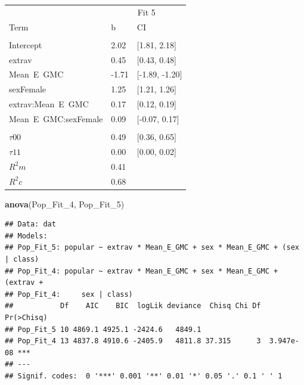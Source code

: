 \documentclass[]{article}
\newenvironment{Shaded}{\begin{snugshade}}{\end{snugshade}}
\newcommand{\KeywordTok}[1]{\textcolor[rgb]{0.13,0.29,0.53}{\textbf{#1}}}
\newcommand{\DecValTok}[1]{\textcolor[rgb]{0.00,0.00,0.81}{#1}}
\newcommand{\NormalTok}[1]{#1}
\begin{document}
\begin{tabular}{lll}
\toprule
\multicolumn{1}{c}{ } & \multicolumn{2}{c}{Fit 5} \\
\cmidrule(l{2pt}r{2pt}){2-3}
Term & b & CI\\
\midrule
\addlinespace[0.3em]
\multicolumn{3}{l}{\textbf{Fixed}}\\
\hspace{1em}Intercept & 2.02 & [1.81, 2.18]\\
\hspace{1em}extrav & 0.45 & [0.43, 0.48]\\
\hspace{1em}Mean\ E\ GMC & -1.71 & [-1.89, -1.20]\\
\hspace{1em}sexFemale & 1.25 & [1.21, 1.26]\\
\hspace{1em}extrav:Mean\ E\ GMC & 0.17 & [0.12, 0.19]\\
\hspace{1em}Mean\ E\ GMC:sexFemale & 0.09 & [-0.07, 0.17]\\
\addlinespace[0.3em]
\multicolumn{3}{l}{\textbf{Random}}\\
\hspace{1em}$\tau {00}$ & 0.49 & [0.36, 0.65]\\
\hspace{1em}$\tau {11}$ & 0.00 & [0.00, 0.02]\\
$R^2 m$ & 0.41 & \\
$R^2 c$ & 0.68 & \\
\bottomrule
\end{tabular}

\begin{Shaded}
\begin{Highlighting}[]
\KeywordTok{anova}\NormalTok{(Pop_Fit_}\DecValTok{4}\NormalTok{, Pop_Fit_}\DecValTok{5}\NormalTok{)}
\end{Highlighting}
\end{Shaded}

\begin{verbatim}
## Data: dat
## Models:
## Pop_Fit_5: popular ~ extrav * Mean_E_GMC + sex * Mean_E_GMC + (sex | class)
## Pop_Fit_4: popular ~ extrav * Mean_E_GMC + sex * Mean_E_GMC + (extrav + 
## Pop_Fit_4:     sex | class)
##           Df    AIC    BIC  logLik deviance  Chisq Chi Df Pr(>Chisq)    
## Pop_Fit_5 10 4869.1 4925.1 -2424.6   4849.1                             
## Pop_Fit_4 13 4837.8 4910.6 -2405.9   4811.8 37.315      3  3.947e-08 ***
## ---
## Signif. codes:  0 '***' 0.001 '**' 0.01 '*' 0.05 '.' 0.1 ' ' 1
\end{verbatim}
\end{document}
